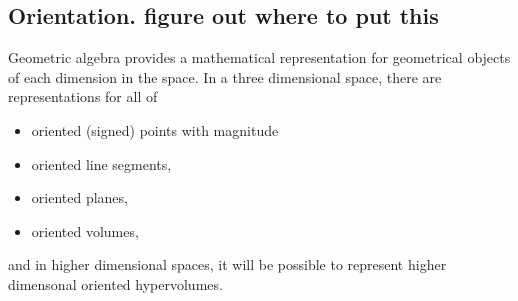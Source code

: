 %
%
\subsection{Orientation.  figure out where to put this}
Geometric algebra provides a mathematical representation for geometrical objects of each dimension in the space.
In a three dimensional space, there are representations for all of

\begin{itemize}
\item
oriented (signed) points with magnitude
\item
oriented line segments,
\item
oriented planes,
\item
oriented volumes,
\end{itemize}

and in higher dimensional spaces, it will be possible to represent higher dimensonal oriented hypervolumes.

